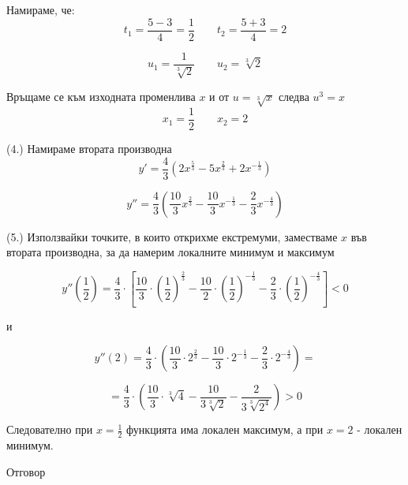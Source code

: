 \documentclass{article}
\begin{document}
\vspace{0.5cm}
Намираме, че:
\[ t_1 = \frac{5 - 3}{4} = \frac{1}{2} \qquad t_2 = \frac{5 + 3}{4} = 2 \]

\vspace{0.5cm}
\[ u_1 = \frac{1}{\sqrt[3]{2}} \qquad u_2 = \sqrt[3]{2} \]

\vspace{0.5cm}
Връщаме се към изходната променлива $x$ и от $ u = \sqrt[3]{x} $ следва $ u^3 = x $
\[ x_1 = \frac{1}{2} \qquad x_2 = 2 \]

\newpage

\vspace{0.5cm}
(4.) Намираме втората производна
\[ y' = \frac{4}{3} \left({2x^\frac{5}{3}} - {5x^\frac{2}{3}} + {2x^{-\frac{1}{3}}}\right) \]

\[ y'' = \frac{4}{3} \left({\frac{10}{3}x^\frac{2}{3}} - {\frac{10}{3}x^{-\frac{1}{3}}} - {\frac{2}{3}x^{-\frac{4}{3}}}\right) \]

\vspace{0.5cm}
(5.) Използвайки точките, в които открихме \linebreak екстремуми, заместваме $x$ във втората производна, за да намерим локалните минимум и максимум
\vspace{0.5cm}

\[
    y''\left(\frac{1}{2}\right) = \frac{4}{3} \cdot \left[ \frac{10}{3} \cdot \left(\frac{1}{2}\right)^{\frac{2}{3}} - \frac{10}{2} \cdot \left(\frac{1}{2}\right)^{-\frac{1}{3}} - \frac{2}{3} \cdot \left(\frac{1}{2}\right)^{-\frac{4}{3}} \right] < 0
\]

\vspace{0.25cm}

\begin{center}
    и
\end{center}

\vspace{0.25cm}
\[
    y''(2) = \frac{4}{3} \cdot \left( \frac{10}{3} \cdot 2^{\frac{2}{3}} - \frac{10}{3} \cdot 2^{-\frac{1}{3}} - \frac{2}{3} \cdot 2^{-\frac{4}{3}} \right) =
\]


\[
    = \frac{4}{3} \cdot \left( \frac{10}{3} \cdot \sqrt[3]{4} - \frac{10}{3 \sqrt[3]{2}} - \frac{2}{3 \sqrt[3]{2^4}} \right) > 0
\]

\vspace{1cm}
Следователно при $ x = \frac{1}{2} $ функцията има локален максимум, а при $ x = 2 $ - локален минимум.
\newpage
\begin{center}
    Отговор
\end{center}
\end{document}
